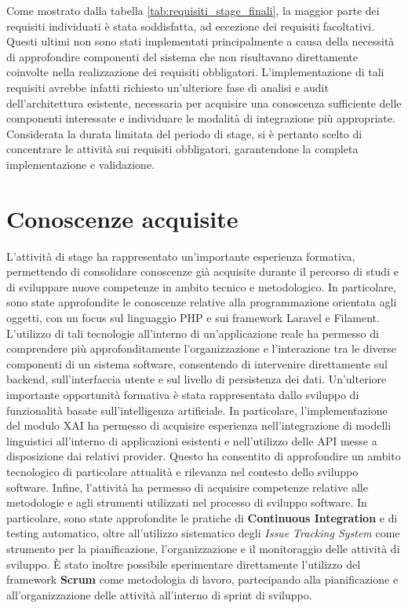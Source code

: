 Come mostrato dalla tabella \ref{tab:requisiti_stage_finali}, la maggior parte dei requisiti individuati è stata soddisfatta, ad eccezione dei requisiti facoltativi. Questi ultimi non sono stati 
implementati principalmente a causa della necessità di approfondire componenti del sistema che non risultavano direttamente coinvolte nella realizzazione dei requisiti obbligatori.
\newline
L'implementazione di tali requisiti avrebbe infatti richiesto un'ulteriore fase di analisi e audit dell'architettura esistente, necessaria per acquisire una conoscenza sufficiente delle componenti 
interessate e individuare le modalità di integrazione più appropriate. Considerata la durata limitata del periodo di stage, si è pertanto scelto di concentrare le attività sui requisiti obbligatori, 
garantendone la completa implementazione e validazione.


\section{Conoscenze acquisite}
L'attività di stage ha rappresentato un'importante esperienza formativa, permettendo di consolidare conoscenze già acquisite durante il percorso di studi e di sviluppare nuove competenze in ambito tecnico e 
metodologico.
\newline
In particolare, sono state approfondite le conoscenze relative alla programmazione orientata agli oggetti, con un focus sul linguaggio PHP e sui framework Laravel e Filament. L'utilizzo di tali tecnologie 
all'interno di un'applicazione reale ha permesso di comprendere più approfonditamente l'organizzazione e l'interazione tra le diverse componenti di un sistema software, consentendo di intervenire direttamente 
sul backend, sull'interfaccia utente e sul livello di persistenza dei dati.
\newline
Un'ulteriore importante opportunità formativa è stata rappresentata dallo sviluppo di funzionalità basate sull'intelligenza artificiale. In particolare, l'implementazione del modulo XAI ha permesso di acquisire 
esperienza nell'integrazione di modelli linguistici all'interno di applicazioni esistenti e nell'utilizzo delle API messe a disposizione dai relativi provider. Questo ha consentito di approfondire un ambito 
tecnologico di particolare attualità e rilevanza nel contesto dello sviluppo software.
\newline
Infine, l'attività ha permesso di acquisire competenze relative alle metodologie e agli strumenti utilizzati nel processo di sviluppo software. In particolare, sono state approfondite le pratiche di \textbf{Continuous 
Integration} e di testing automatico, oltre all'utilizzo sistematico degli \textit{Issue Tracking System} come strumento per la pianificazione, l'organizzazione e il monitoraggio delle attività di sviluppo. È stato 
inoltre possibile sperimentare direttamente l'utilizzo del framework \textbf{Scrum} come metodologia di lavoro, partecipando alla pianificazione e all'organizzazione delle attività all'interno di sprint di sviluppo.

